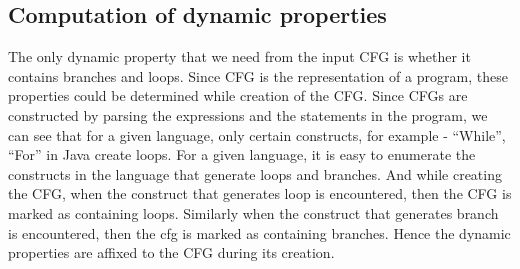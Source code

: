 \subsection{Computation of dynamic properties}
\label{sec:dynamic}
The only dynamic property that we need from the input CFG is whether it contains
branches and loops. Since CFG is the representation of a program, these
properties could be determined while creation of the CFG. Since CFGs are
constructed by parsing the expressions and the statements in the program, we can
see that for a given language, only certain constructs, for example - “While”,
“For” in Java create loops. For a given language, it is easy to enumerate the
constructs in the language that generate loops and branches. And while creating
the CFG, when the construct that generates loop is encountered, then the CFG is
marked as containing loops. Similarly when the construct that generates branch
is encountered, then the cfg is marked as containing branches.
Hence the dynamic properties are affixed to the CFG during its creation.